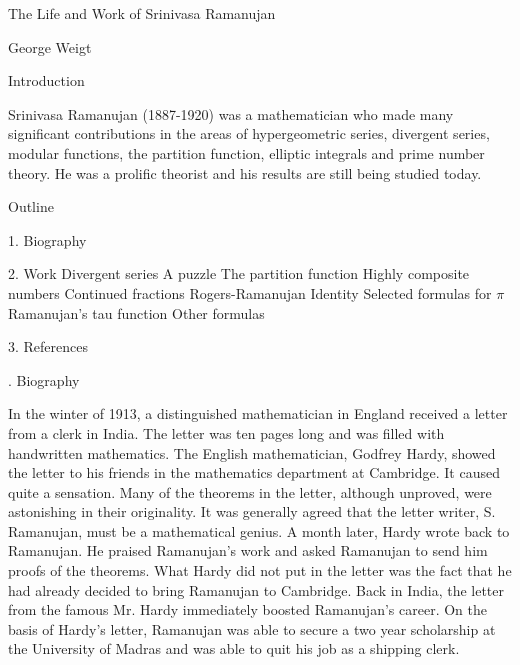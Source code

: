 \centerline{The Life and Work of Srinivasa Ramanujan}
\centerline{George Weigt}

\beginsection Introduction

Srinivasa Ramanujan (1887-1920) was a mathematician who made
many significant contributions in the areas of hypergeometric series,
divergent series, modular functions, the partition function,
elliptic integrals and prime
number theory.
He was a prolific theorist and his results are still being studied
today.

\beginsection Outline

\item{1.}
Biography
\item{2.}
Work
 Divergent series
 A puzzle
 The partition function
 Highly composite numbers
 Continued fractions
 Rogers-Ramanujan Identity
 Selected formulas for $\pi$
 Ramanujan's tau function
 Other formulas
\item{3.}
References

. Biography

In the winter of 1913, a distinguished mathematician in England
received a letter from a clerk in India.
The letter was ten pages long and was filled with handwritten
mathematics.
The English mathematician, Godfrey Hardy, showed the letter to his friends in the
mathematics department at Cambridge.
It caused quite a sensation.
Many of the theorems in the letter, although unproved,
were astonishing in their originality.
It was generally agreed that the letter writer, S. Ramanujan,
must be a mathematical genius.
A month later, Hardy wrote back to Ramanujan.
He praised Ramanujan's work and asked Ramanujan to send him
proofs of the theorems.
What Hardy did not put in the letter was the fact that he
had already decided to bring Ramanujan to Cambridge.
Back in India, the letter from the famous Mr. Hardy immediately
boosted Ramanujan's career.
On the basis of Hardy's letter,
Ramanujan was able to secure a two year scholarship at the University of
Madras and was able to quit his job as a shipping clerk.

